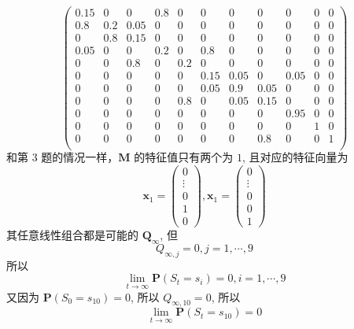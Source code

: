 \documentclass[11pt,letter,notitlepage]{article}
\begin{document}
\begin{solution}
\begin{enumerate}
$$\begin{pmatrix}
				      0.15 & 0   & 0    & 0.8 & 0   & 0    & 0    & 0    & 0    & 0 & 0 \\
				      0.8  & 0.2 & 0.05 & 0   & 0   & 0    & 0    & 0    & 0    & 0 & 0 \\
				      0    & 0.8 & 0.15 & 0   & 0   & 0    & 0    & 0    & 0    & 0 & 0 \\
				      0.05 & 0   & 0    & 0.2 & 0   & 0.8  & 0    & 0    & 0    & 0 & 0 \\
				      0    & 0   & 0.8  & 0   & 0.2 & 0    & 0    & 0    & 0    & 0 & 0 \\
				      0    & 0   & 0    & 0   & 0   & 0.15 & 0.05 & 0    & 0.05 & 0 & 0 \\
				      0    & 0   & 0    & 0   & 0   & 0.05 & 0.9  & 0.05 & 0    & 0 & 0 \\
				      0    & 0   & 0    & 0   & 0.8 & 0    & 0.05 & 0.15 & 0    & 0 & 0 \\
				      0    & 0   & 0    & 0   & 0   & 0    & 0    & 0    & 0.95 & 0 & 0 \\
				      0    & 0   & 0    & 0   & 0   & 0    & 0    & 0    & 0    & 1 & 0 \\
				      0    & 0   & 0    & 0   & 0   & 0    & 0    & 0.8  & 0    & 0 & 1 \\
			      \end{pmatrix}$$
		      和第 3 题的情况一样，$\mathbf{M}$ 的特征值只有两个为 $1$, 且对应的特征向量为
		      $$\mathbf{x}_1=\begin{pmatrix}
				      0 \\ \vdots\\0\\1\\0
			      \end{pmatrix}, \mathbf{x}_1=\begin{pmatrix}
				      0 \\ \vdots\\0\\0\\1
			      \end{pmatrix}$$
		      其任意线性组合都是可能的 $\mathbf{Q}_\infty$, 但
		      $$Q_{\infty,j}=0, j=1,\cdots,9$$
		      所以 $$\lim_{t\rightarrow\infty} \mathbf{P}(S_t=s_i)=0,i=1,\cdots,9$$
		      又因为 $\mathbf{P}(S_0=s_{10})=0$, 所以 $Q_{\infty,10}=0$, 所以
		      $$\lim_{t\rightarrow\infty} \mathbf{P}(S_t=s_{10})=0$$
	\end{enumerate}
\end{solution}
\end{document}
